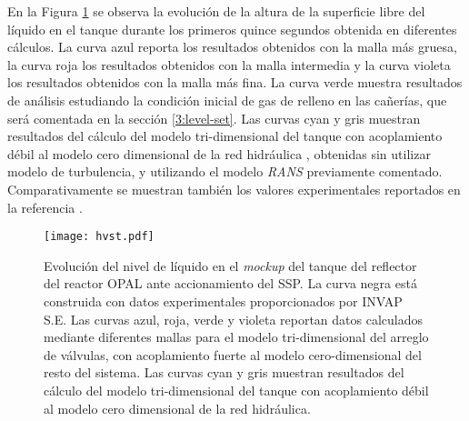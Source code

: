 
En la Figura \ref{hvst} se observa la evolución de la altura de la superficie libre del líquido en el tanque durante los primeros quince segundos obtenida en diferentes cálculos.
La curva azul reporta los resultados obtenidos con la malla más gruesa, la curva roja los resultados obtenidos con la malla intermedia y la curva violeta los resultados obtenidos con la malla más fina.
La curva verde muestra resultados de análisis estudiando la condición inicial de gas de relleno en las cañerías, que será comentada en la sección \ref{3:level-set}.
Las curvas cyan y gris muestran resultados del cálculo del modelo tri-dimensional del tanque con acoplamiento débil al modelo cero dimensional de la red hidráulica \cite{ra10-paper},
obtenidas sin utilizar modelo de turbulencia, y utilizando el modelo \textit{RANS} previamente comentado.
Comparativamente se muestran también los valores experimentales reportados en la referencia \cite{invap-mockup}.

\begin{figure}[ht]
\centering
\texttt{[image: hvst.pdf]}
\caption[Evolución del nivel de líquido en el \textit{mockup} del tanque del reflector del reactor OPAL ante accionamiento del SSP]
{Evolución del nivel de líquido en el \textit{mockup} del tanque del reflector del reactor OPAL ante accionamiento del SSP.
La curva negra está construida con datos experimentales proporcionados por INVAP S.E.
Las curvas azul, roja, verde y violeta reportan datos calculados mediante diferentes mallas para el modelo tri-dimensional del arreglo de válvulas, 
con acoplamiento fuerte al modelo cero-dimensional del resto del sistema.
Las curvas cyan y gris muestran resultados del cálculo del modelo tri-dimensional del tanque con acoplamiento débil al modelo cero dimensional de la red hidráulica.}
\label{hvst} 
\end{figure}

